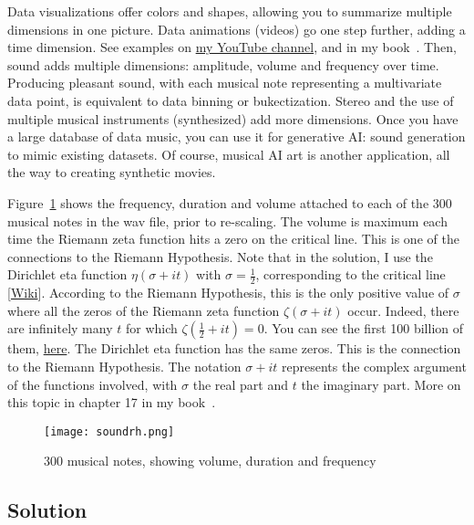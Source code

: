 \documentclass[oneside,10pt]{book}
\begin{document}
\noindent Data visualizations offer colors and shapes, allowing you to summarize multiple dimensions in one picture. Data animations (videos) go one step further, adding a time dimension. See examples on 
\href{https://www.youtube.com/c/VincentGranvilleVideos}{my YouTube channel}, and in my book~\cite{vgelsevier}. Then, sound adds multiple dimensions: amplitude, volume and frequency over time. Producing pleasant sound, with each musical note representing a multivariate data point, is equivalent to data binning or bukectization.
Stereo and the use of multiple musical instruments (synthesized) add more dimensions. Once you have a large database of data music, you can use it for generative AI: sound generation to mimic existing datasets. Of course, musical AI art is another application, all the way to creating synthetic movies.

Figure~\ref{fig:gretelbwacxzzz} shows the frequency, duration and volume attached to each of the 300 musical notes in the wav file, prior to re-scaling. The volume is maximum each time the Riemann zeta function hits a zero on the critical line. This is one of the connections to the Riemann Hypothesis. Note that in the solution, I use the Dirichlet eta function $\eta(\sigma + it)$ with $\sigma=\frac{1}{2}$,
 corresponding to the critical line [\href{https://mathworld.wolfram.com/CriticalLine.html}{Wiki}]. According to the Riemann Hypothesis, 
 this is the only positive value of $\sigma$ where all the zeros of the \textcolor{index}{Riemann zeta function} 
 $\zeta(\sigma+it)$ occur. 
 Indeed, there are infinitely many $t$ for which $\zeta(\frac{1}{2}+it)=0$. You can see the first 100 billion of them, 
\href{https://www.lmfdb.org/zeros/zeta/}{here}. 
The Dirichlet eta function has the same zeros. This is the connection to the Riemann Hypothesis.  The notation $\sigma+it$ represents the complex argument of the functions involved, with $\sigma$ the real part and $t$ the imaginary part. More on this topic in
 chapter 17 in my book~\cite{vgelsevier}. 




\begin{figure}[H]
\centering
\texttt{[image: soundrh.png]}   
\caption{300 musical notes, showing volume, duration and frequency}
\label{fig:gretelbwacxzzz}
\end{figure}


\subsection{Solution}
\end{document}
